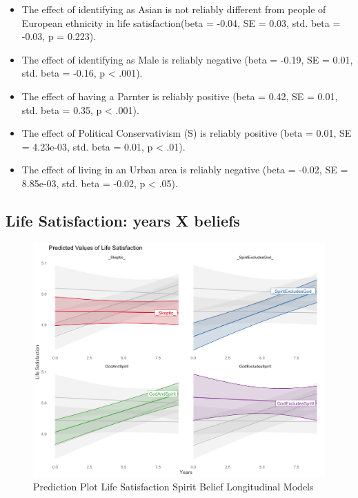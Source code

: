 \documentclass[
  english,
  man]{apa6}
\begin{document}
\begin{itemize}
\item
  The effect of identifying as Asian is not reliably different from people of European ethnicity in life satisfaction(beta = -0.04, SE = 0.03, std. beta = -0.03, p = 0.223).
\item
  The effect of identifying as Male is reliably negative (beta = -0.19, SE = 0.01, std. beta = -0.16, p \textless{} .001).
\item
  The effect of having a Parnter is reliably positive (beta = 0.42, SE = 0.01, std. beta = 0.35, p \textless{} .001).
\item
  The effect of Political Conservativism (S) is reliably positive (beta = 0.01, SE = 4.23e-03, std. beta = 0.01, p \textless{} .01).
\item
  The effect of living in an Urban area is reliably negative (beta = -0.02, SE = 8.85e-03, std. beta = -0.02, p \textless{} .05).
\end{itemize}

\hypertarget{life-satisfaction-years-x-beliefs}{%
\subsection{Life Satisfaction: years X beliefs}\label{life-satisfaction-years-x-beliefs}}

\begin{figure}
\includegraphics[width=6.4in]{Figs/USElifsat_expected-1} \caption{Prediction Plot Life Satisfaction Spirit Belief Longitudinal Models}\label{fig:unnamed-chunk-3}
\end{figure}
\end{document}
